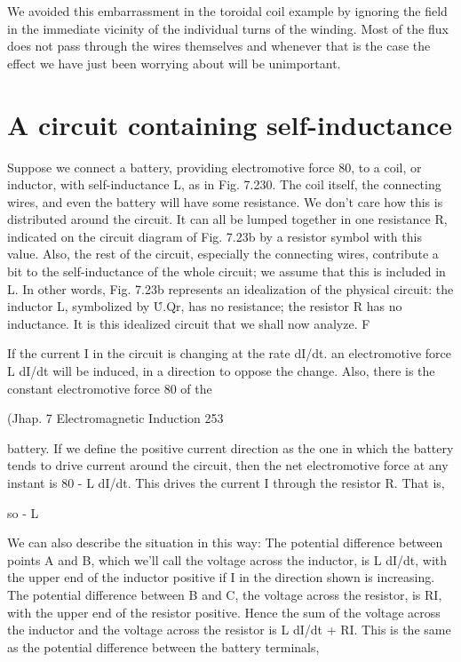 We avoided this embarrassment in the toroidal coil example by
ignoring the field in the immediate vicinity of the individual turns of
the winding. Most of the flux does not pass through the wires themselves
and whenever that is the case the effect we have just been
worrying about will be unimportant.

\section{A circuit containing self-inductance}

Suppose we connect a battery, providing electromotive force 80,
to a coil, or inductor, with self-inductance L, as in Fig. 7.230. The
coil itself, the connecting wires, and even the battery will have some
resistance. We don't care how this is distributed around the circuit.
It can all be lumped together in one resistance R, indicated on the
circuit diagram of Fig. 7.23b by a resistor symbol with this value.
Also, the rest of the circuit, especially the connecting wires, contribute
a bit to the self-inductance of the whole circuit; we assume that
this is included in L. In other words, Fig. 7.23b represents an
idealization of the physical circuit: the inductor L, symbolized by
\.U.Qr, has no resistance; the resistor R has no inductance. It is
this idealized circuit that we shall now analyze. F

If the current I in the circuit is changing at the rate dI/dt. an electromotive
force L dI/dt will be induced, in a direction to oppose the
change. Also, there is the constant electromotive force 80 of the

(Jhap. 7 Electromagnetic Induction 253

battery. If we define the positive current direction as the one in
which the battery tends to drive current around the circuit, then the
net electromotive force at any instant is 80 - L dI/dt. This drives
the current I through the resistor R. That is,

so - L%

We can also describe the situation in this way: The potential difference
between points A and B, which we'll call the voltage across
the inductor, is L dI/dt, with the upper end of the inductor positive
if I in the direction shown is increasing. The potential difference
between B and C, the voltage across the resistor, is RI, with the upper
end of the resistor positive. Hence the sum of the voltage across the
inductor and the voltage across the resistor is L dI/dt + RI. This is
the same as the potential difference between the battery terminals,

